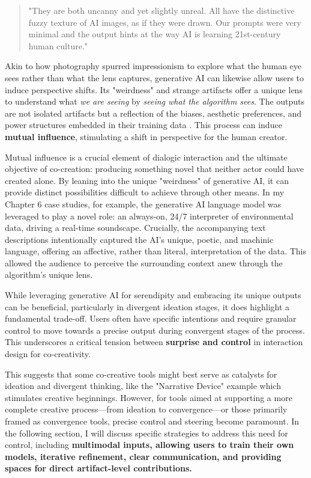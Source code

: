 \begin{quote}
"They are both uncanny and yet slightly unreal. All have the distinctive fuzzy texture of AI images, as if they were drawn. Our prompts were very minimal and the output hints at the way AI is learning 21st-century human culture."
\end{quote}

Akin to how photography spurred impressionism to explore what the human eye sees rather than what the lens captures, generative AI can likewise allow users to induce perspective shifts. Its "weirdness" and strange artifacts offer a unique lens to understand what \textit{we are seeing} by \textit{seeing what the algorithm sees}. The outputs are not isolated artifacts but a reflection of the biases, aesthetic preferences, and power structures embedded in their training data \cite{Schaerf2024-gf, Cetinic2022-tw, Rodriguez-Ortega2022-ak, Salvaggio2023-cv}. This process can induce \textbf{mutual influence}, stimulating a shift in perspective for the human creator.

Mutual influence is a crucial element of dialogic interaction and the ultimate objective of co-creation: producing something novel that neither actor could have created alone. By leaning into the unique "weirdness" of generative AI, it can provide distinct possibilities difficult to achieve through other means. In my Chapter 6 case studies, for example, the generative AI language model was leveraged to play a novel role: an always-on, 24/7 interpreter of environmental data, driving a real-time soundscape. Crucially, the accompanying text descriptions intentionally captured the AI's unique, poetic, and machinic language, offering an affective, rather than literal, interpretation of the data. This allowed the audience to perceive the surrounding context anew through the algorithm's unique lens.

While leveraging generative AI for serendipity and embracing its unique outputs can be beneficial, particularly in divergent ideation stages, it does highlight a fundamental trade-off. Users often have specific intentions and require granular control to move towards a precise output during convergent stages of the process. This underscores a critical tension between \textbf{surprise and control} in interaction design for co-creativity.

This suggests that some co-creative tools might best serve as catalysts for ideation and divergent thinking, like the "Narrative Device" example which stimulates creative beginnings. However, for tools aimed at supporting a more complete creative process—from ideation to convergence—or those primarily framed as convergence tools, precise control and steering become paramount. In the following section, I will discuss specific strategies to address this need for control, including \textbf{multimodal inputs, allowing users to train their own models, iterative refinement, clear communication, and providing spaces for direct artifact-level contributions.}

